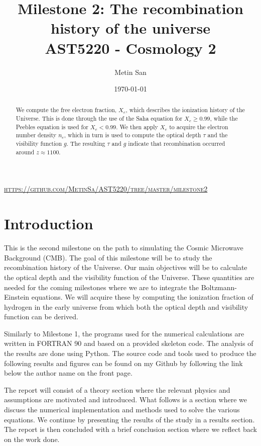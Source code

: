 \documentclass[a4paper, 10pt, reqno]{amsart}
\title[Milestone 1]{\Large{Milestone 2: The recombination history of the universe} \\
\normalsize{AST5220 - Cosmology 2}}
\author[San]{Metin San}
\date{\today}
\begin{document}
\maketitle
\begin{center}
   \vspace*{-0.6cm} \textsc{\url{https://github.com/MetinSa/AST5220/tree/master/milestone2}}
\end{center}

\begin{abstract}
We compute the free electron fraction, $X_e$,  which describes the ionization history of the Universe. This is done through the use of the Saha equation for $X_e \geq 0.99$, while the Peebles equation is used for $X_e < 0.99$. We then apply $X_e$ to acquire the electron number density $n_e$, which in turn is used to compute the optical depth $\tau$ and the visibility function $g$. The resulting $\tau$ and $g$ indicate that recombination occurred around $z \approx 1100$.
\end{abstract}

\section{Introduction}
This is the second milestone on the path to simulating the Cosmic Microwave
Background (CMB). The goal of this milestone will be to study the
recombination history of the Universe. Our main objectives will be to
calculate the optical depth and the visibility function of the Universe. These
quantities are needed for the coming milestones where we are to integrate the
Boltzmann-Einstein equations. We will acquire these by computing the
ionization fraction of hydrogen in the early universe from which both the
optical depth and visibility function can be derived.

Similarly to Milestone 1, the programs used for the numerical calculations are
written in FORTRAN 90 and based on a provided skeleton code. The analysis of
the results are done using Python. The source code and tools used to produce
the following results and figures can be found on my Github by following the
link below the author name on the front page.

The report will consist of a theory section where the relevant physics and
assumptions are motivated and introduced. What follows is a section where we
discuss the numerical implementation and methods used to solve the various
equations. We continue by presenting the results of the study in a results
section. The report is then concluded with a brief conclusion section where we
reflect back on the work done.
\end{document}
